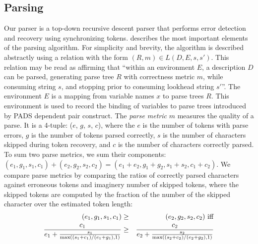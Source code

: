 \subsection{Parsing}
\label{sec:parse}
Our parser is a top-down recursive descent parser
that performs error detection and recovery using synchronizing tokens.
 describes the most important elements
of the parsing algorithm.  For simplicity and brevity,
the algorithm is described abstractly
using a relation with the form 
$(R, m) \in L(D, E, s, s')$.  This relation may be
read as affirming that ``within an environment $E$, a description $D$
can be parsed, generating parse tree $R$ with correctness metric $m$, 
while consuming string $s$, and stopping prior to consuming lookhead 
string $s'$''.  The environment $E$ is a mapping from variable names
$x$ to parse trees $R$.  This environment is used to record the
binding of variables to parse trees introduced by PADS dependent
pair construct.
The {\em parse metric} $m$ measures the quality of a parse. It is a 
4-tuple: ($e$, $g$, $s$, $c$), where the $e$ is the number of tokens
with parse errors, $g$ is the number of tokens parsed correctly,
$s$ is the number of 
characters skipped during  token recovery, 
and $c$ is the number of characters correctly parsed. 
To sum two parse metrics, we sum their components:
$(e_1, g_1, s_1, c_1) + (e_2, g_2, s_2, c_2) = 
(e_1 + e_2, g_1 + g_2, s_1 + s_2, c_1 + c_2)$.
We compare parse metrics by comparing the ratios of correctly
parsed characters against erroneous tokens and imaginery number of
skipped tokens, where the skipped tokens are computed by the
fraction of the number of the skipped character over the estimated token
length:
\begin{eqnarray*}
(e_1, g_1, s_1, c_1) &\ge& (e_2, g_2, s_2, c_2)~ \rm{iff} \\
\frac{c_1}{e_1+\frac{s_1}{\max((s_1+c_1)/(e_1+g_1), 1)}} &\ge& 
\frac{c_2}{e_2+\frac{s_2}{\max((s_2+c_2)/(e_2+g_2), 1)}} 
\end{eqnarray*}

